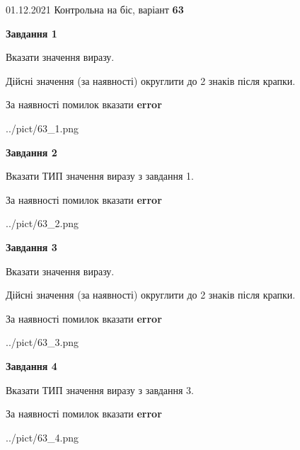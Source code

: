 \documentclass[11pt, ukrainian]{article}
\begin{document}
{01.12.2021 Контрольна на біс, варіант  \No \textbf { 63 }\par}
{
\begin {large}
{\begin {center}\textbf{Завдання 1}\end {center}}\par
Вказати значення виразу. \par
Дійсні значення (за наявності) округлити до 2 знаків після крапки. \par
За наявності помилок вказати \textbf{error}

\begin{center}
	{../pict/63_1.png}
\end{center}
\newpage

{\begin {center}\textbf{Завдання 2}\end {center}}\par
Вказати ТИП значення виразу з завдання 1. \par
За наявності помилок вказати \textbf{error}

\begin{center}
	{../pict/63_2.png}
\end{center}
\newpage

{\begin {center}\textbf{Завдання 3}\end {center}}\par
Вказати значення виразу. \par
Дійсні значення (за наявності) округлити до 2 знаків після крапки. \par
За наявності помилок вказати \textbf{error}

\begin{center}
	{../pict/63_3.png}
\end{center}
\newpage

{\begin {center}\textbf{Завдання 4}\end {center}}\par
Вказати ТИП значення виразу з завдання 3. \par
За наявності помилок вказати \textbf{error}

\begin{center}
	{../pict/63_4.png}
\end{center}
\newpage


\end{large}}
\end{document}
